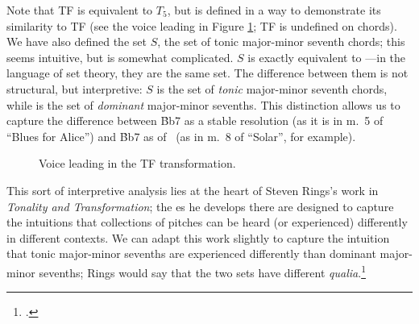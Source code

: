 \noindent Note that TF is equivalent to $T_5$, but is defined in a
way to demonstrate its similarity to TF (see the voice leading in Figure
\ref{tfe:tf-blues-voice-leading}; TF is undefined on \ii chords).
We have also defined the set $S$, the set of tonic major-minor
seventh chords; this seems intuitive, but is somewhat complicated.
$S$ is exactly equivalent to \Sdom---in the language of set theory,
they are the same set. The difference between them is not structural, but
interpretive: $S$ is the set of \emph{tonic} major-minor seventh
chords, while \Sdom is the set of \emph{dominant} major-minor sevenths. This
distinction allows us to capture the difference between \h{Bb7} as a stable
resolution (as it is in m.~5 of ``Blues for Alice'') and \h{Bb7} as \V of
\Eflat\ (as in m.~8 of ``Solar'', for example).

\begin{figure}[tbp]
  \caption{Voice leading in the TF transformation.}
  \label{tfe:tf-blues-voice-leading}
\end{figure}

This sort of interpretive analysis lies at the heart of Steven Rings's work in
\emph{Tonality and Transformation}; the \gis{}es he develops there are
designed to capture the intuitions that collections of pitches can be
heard (or experienced) differently in different contexts. We can adapt this
work slightly to capture the intuition that tonic major-minor sevenths are
experienced differently than dominant major-minor sevenths; Rings would say
that the two sets have different \emph{qualia}.\footcite[41--43 (and
throughout)]{rings:2011}

